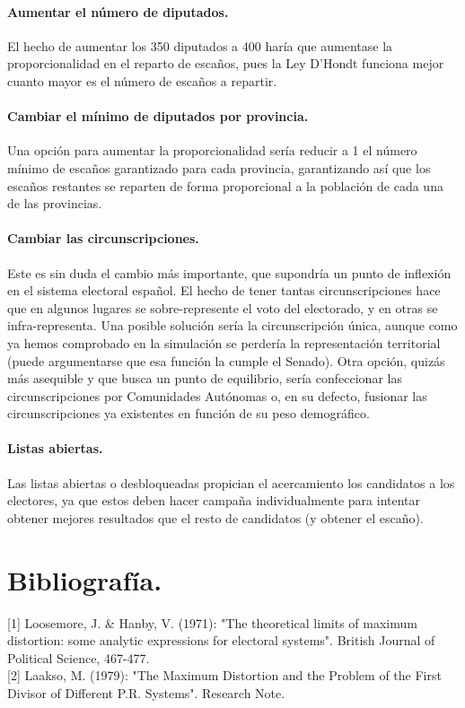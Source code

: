 \documentclass[11pt]{article}
\begin{document}
	\paragraph{Aumentar el número de diputados.}
	
	El hecho de aumentar los 350 diputados a 400 haría que aumentase la proporcionalidad en el reparto de escaños, pues la Ley D'Hondt funciona mejor cuanto mayor es el número de escaños a repartir.
	
	\paragraph{Cambiar el mínimo de diputados por provincia.}
	
	Una opción para aumentar la proporcionalidad sería reducir a 1 el número mínimo de escaños garantizado para cada provincia, garantizando así que los escaños restantes se reparten de forma proporcional a la población de cada una de las provincias.
	
	\paragraph{Cambiar las circunscripciones.}
	
	Este es sin duda el cambio más importante, que supondría un punto de inflexión en el sistema electoral español. El hecho de tener tantas circunscripciones hace que en algunos lugares se sobre-represente el voto del electorado, y en otras se infra-representa. Una posible solución sería la circunscripción única, aunque como ya hemos comprobado en la simulación se perdería la representación territorial (puede argumentarse que esa función la cumple el Senado). Otra opción, quizás más asequible y que busca un punto de equilibrio, sería confeccionar las circunscripciones por Comunidades Autónomas o, en su defecto, fusionar las circunscripciones ya existentes en función de su peso demográfico.
	
		\paragraph{Listas abiertas.}
	
	Las listas abiertas o desbloqueadas propician el acercamiento los candidatos a los electores, ya que estos deben hacer campaña individualmente para intentar obtener mejores resultados que el resto de candidatos (y obtener el escaño).
	
	
	\section*{Bibliografía.}

	[1] Loosemore, J. \& Hanby, V. (1971): "The theoretical limits of maximum distortion: some analytic expressions for electoral systems". British Journal of Political Science, 467-477.\\

	[2] Laakso, M. (1979): "The Maximum Distortion and the Problem of the First Divisor of Different P.R. Systems". Research Note.\\
	
	
\end{document}
